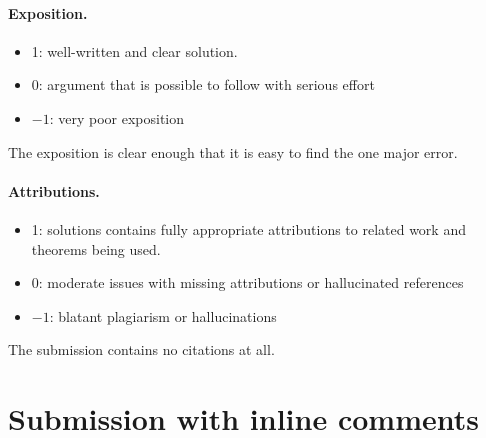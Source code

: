 \documentclass[11pt]{article}
\theoremstyle{definition}
\theoremstyle{remark}
\newcommand{\CP}{\mathbb{CP}}
\begin{document}
\paragraph{Exposition.}
\begin{itemize}
	\item  1: well-written and clear solution.
	\item  0: argument that is possible to follow with serious effort
	\item  $-1$: very poor exposition
\end{itemize}

 The exposition is clear enough that it is easy to find the one major error. 

\paragraph{Attributions.}
\begin{itemize}
	\item  1: solutions contains fully appropriate attributions
		to related work and theorems being used.
	\item  0: moderate issues with missing attributions or hallucinated references
	\item  $-1$: blatant plagiarism or hallucinations
\end{itemize}

 The submission contains no citations at all.

\newpage
\section{Submission with inline comments}


\begin{abstract}
\noindent We prove that the answer to the question is \emph{no} in
general. If $(M,\omega)$ is a symplectic manifold, $D\subset M$ a
symplectic simple normal crossings divisor, and $J$ an $\omega$-tame
almost complex structure admitting, locally on $M$, smooth complex
coordinates $(z_1,\ldots,z_n)$ with $z_1,\ldots,z_r$
$J$-holomorphic and $D=\{z_1\cdots z_r=0\}$, then the normal bundle
of every compact connected component $D_\alpha$ of $D$ admits a flat
structure with locally constant (locally) $J$-holomorphic trivialising
frames; 
in particular
\[
\langle e(\nu_{D_\alpha}),[D_\alpha]\rangle\ =\
D_\alpha\cdot D_\alpha\ =\ 0 .
\]
    
For a projective line $L\cong\CP^1$ in $(\CP^2,\omega_{\mathrm{FS}})$
(a symplectic SNC divisor with one component) one has $L\cdot L=1$,
so no such $J$ exists, and the cohomologous deformation of $\omega$
allowed in the question cannot remove the obstruction, which is
topological in the pair $(M,D)$.
\end{abstract}
\end{document}
